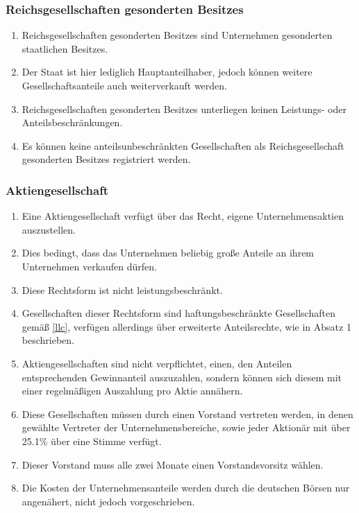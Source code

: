 \documentclass{article}
\begin{document}
\subsubsection{Reichsgesellschaften gesonderten Besitzes}
\begin{enumerate}[(1)]
    \item Reichsgesellschaften gesonderten Besitzes sind Unternehmen gesonderten staatlichen Besitzes.
    \item Der Staat ist hier lediglich Hauptanteilhaber, jedoch können weitere Gesellschaftsanteile auch weiterverkauft werden.
    \item Reichsgesellschaften gesonderten Besitzes unterliegen keinen Leistungs- oder Anteilsbeschränkungen.
    \item Es können keine anteilsunbeschränkten Gesellschaften als Reichsgesellschaft gesonderten Besitzes registriert werden.
\end{enumerate}

\subsubsection{Aktiengesellschaft}\label{ext}
\begin{enumerate}[(1)]
    \item Eine Aktiengesellschaft verfügt über das Recht, eigene Unternehmensaktien auszustellen.
    \item Dies bedingt, dass das Unternehmen beliebig große Anteile an ihrem Unternehmen verkaufen dürfen.
    \item Diese Rechtsform ist nicht leistungsbeschränkt.
    \item Gesellschaften dieser Rechtsform sind haftungsbeschränkte Gesellschaften gemäß \ref{llc}, verfügen allerdings über erweiterte Anteilsrechte, wie in Absatz 1 beschrieben.
    \item Aktiengesellschaften sind nicht verpflichtet, einen, den Anteilen entsprechenden Gewinnanteil auszuzahlen, sondern können sich diesem mit einer regelmäßigen Auszahlung pro Aktie annähern.
    \item Diese Gesellschaften müssen durch einen Vorstand vertreten werden, in denen gewählte Vertreter der Unternehmensbereiche, sowie jeder Aktionär mit über 25.1\% über eine Stimme verfügt.
    \item Dieser Vorstand muss alle zwei Monate einen Vorstandsvorsitz wählen.
    \item Die Kosten der Unternehmensanteile werden durch die deutschen Börsen nur angenähert, nicht jedoch vorgeschrieben.
\end{enumerate}
\end{document}
